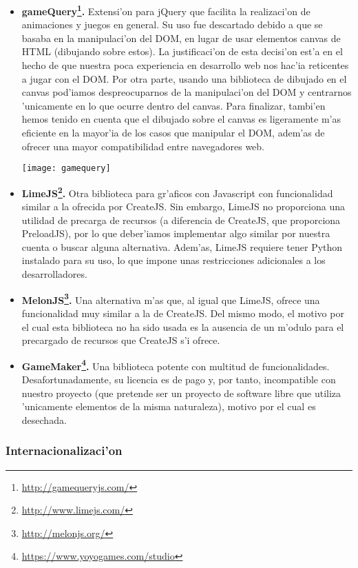 \begin{itemize}
\item \textbf{gameQuery\footnote{\url{http://gamequeryjs.com/}}.} Extensi'on para jQuery que facilita la realizaci'on 
de animaciones y juegos en general. Su uso fue descartado debido a que se basaba en la manipulaci'on
del DOM, en lugar de usar elementos canvas de HTML (dibujando sobre estos). 
La justificaci'on de esta decisi'on est'a en el hecho de que nuestra poca experiencia en
desarrollo web nos hac'ia reticentes a jugar con el DOM. Por otra parte, usando una biblioteca
de dibujado en el canvas pod'iamos despreocuparnos de  la manipulaci'on del DOM y centrarnos
'unicamente en lo que ocurre dentro del canvas.
Para finalizar, tambi'en hemos tenido en cuenta que el dibujado sobre el canvas es ligeramente
m'as eficiente en la mayor'ia de los casos que manipular el DOM, adem'as de ofrecer una mayor
compatibilidad entre navegadores web.

\begin{center}
\texttt{[image: gamequery]}
\end{center}

\item \textbf{LimeJS\footnote{\url{http://www.limejs.com/}}.} Otra biblioteca para gr'aficos con Javascript con funcionalidad similar a la 
ofrecida por CreateJS. Sin embargo, LimeJS no proporciona una utilidad de precarga de recursos 
(a diferencia de CreateJS, que proporciona PreloadJS), por lo que deber'iamos implementar algo
similar por nuestra cuenta o buscar alguna alternativa. Adem'as, LimeJS requiere tener Python
instalado para su uso, lo que impone unas restricciones adicionales a los desarrolladores.
\item \textbf{MelonJS\footnote{\url{http://melonjs.org/}}.} Una alternativa m'as que, al igual que LimeJS, ofrece una funcionalidad muy similar
a la de CreateJS. Del mismo modo, el motivo por el cual esta biblioteca no ha sido usada es la 
ausencia de un m'odulo para el precargado de recursos que CreateJS s'i ofrece.
\item \textbf{GameMaker\footnote{\url{https://www.yoyogames.com/studio}}.} Una biblioteca potente con multitud de funcionalidades. Desafortunadamente, su
licencia es de pago y, por tanto, incompatible con nuestro proyecto (que pretende ser un proyecto
de software libre que utiliza 'unicamente elementos de la misma naturaleza), motivo por el cual 
es desechada.
\end{itemize}

\subsubsection[Internacionalizaci'on (SBP)]{Internacionalizaci'on}
\label{sub:internacionalizacion}

